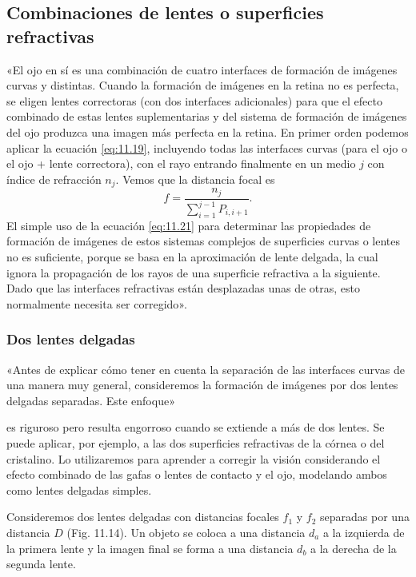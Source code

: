 \documentclass[12pt]{book}
\begin{document}
\subsection{Combinaciones de lentes o superficies refractivas}
\label{subsec:11.2.3}

«El ojo en sí es una combinación de cuatro interfaces de formación de imágenes curvas y distintas. Cuando la formación de imágenes en la retina no es perfecta, se eligen lentes correctoras (con dos interfaces adicionales) para que el efecto combinado de estas lentes suplementarias y del sistema de formación de imágenes del ojo produzca una imagen más perfecta en la retina. En primer orden podemos aplicar la ecuación \eqref{eq:11.19}, incluyendo todas las interfaces curvas (para el ojo o el ojo + lente correctora), con el rayo entrando finalmente en un medio $j$ con índice de refracción $n_j$. Vemos que la distancia focal es
\begin{equation}
f = \frac{n_j}{\sum_{i=1}^{j-1} P_{i, i+1}}. \label{eq:11.21}
\end{equation}
El simple uso de la ecuación \eqref{eq:11.21} para determinar las propiedades de formación de imágenes de estos sistemas complejos de superficies curvas o lentes no es suficiente, porque se basa en la aproximación de lente delgada, la cual ignora la propagación de los rayos de una superficie refractiva a la siguiente. Dado que las interfaces refractivas están desplazadas unas de otras, esto normalmente necesita ser corregido».

\subsubsection*{Dos lentes delgadas}

«Antes de explicar cómo tener en cuenta la separación de las interfaces curvas de una manera muy general, consideremos la formación de imágenes por dos lentes delgadas separadas. Este enfoque»

es riguroso pero resulta engorroso cuando se extiende a más de dos lentes. Se puede aplicar, por ejemplo, a las dos superficies refractivas de la córnea o del cristalino. Lo utilizaremos para aprender a corregir la visión considerando el efecto combinado de las gafas o lentes de contacto y el ojo, modelando ambos como lentes delgadas simples.

Consideremos dos lentes delgadas con distancias focales $f_1$ y $f_2$ separadas por una distancia $D$ (Fig. 11.14). Un objeto se coloca a una distancia $d_a$ a la izquierda de la primera lente y la imagen final se forma a una distancia $d_b$ a la derecha de la segunda lente.
\end{document}
